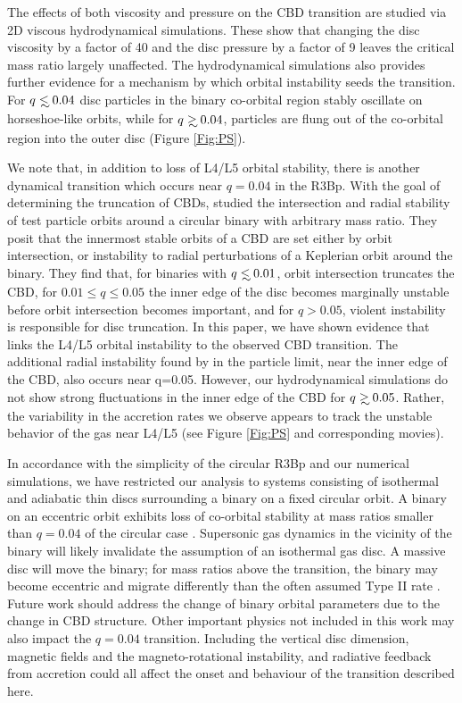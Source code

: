 \documentclass[usenatbib]{mnras}
\newcommand\lsim{\mathrel{\rlap{\lower4pt\hbox{\hskip1pt$\sim$}}
        \raise1pt\hbox{$<$}}}
\newcommand\gsim{\mathrel{\rlap{\lower4pt\hbox{\hskip1pt$\sim$}}
        \raise1pt\hbox{$>$}}}
\begin{document}
The effects of both viscosity and pressure on the CBD transition are
studied via 2D viscous hydrodynamical simulations. These show that
changing the disc viscosity by a factor of 40 and the disc pressure by
a factor of 9 leaves the critical mass ratio largely unaffected.  The
hydrodynamical simulations also provides further evidence for a
mechanism by which orbital instability seeds the transition. For
$q\lsim 0.04$ disc particles in the binary co-orbital region stably
oscillate on horseshoe-like orbits, while for $q \gsim 0.04$,
particles are flung out of the co-orbital region into the outer disc
(Figure \ref{Fig:PS}).


We note that, in addition to loss of L4/L5 orbital stability, there is
another dynamical transition which occurs near $q=0.04$ in the
R3Bp. With the goal of determining the truncation of CBDs,
\cite{RP:Excretion:1981} studied the intersection and radial stability
of test particle orbits around a circular binary with arbitrary mass
ratio. They posit that the innermost stable orbits of a CBD are set
either by orbit intersection, or instability to radial perturbations
of a Keplerian orbit around the binary. They find that, for binaries
with $q \lsim 0.01$, orbit intersection truncates the CBD, for $0.01
\leq q \leq 0.05$ the inner edge of the disc becomes marginally
unstable before orbit intersection becomes important, and for
$q>0.05$, violent instability is responsible for disc truncation. In
this paper, we have shown evidence that links the L4/L5 orbital
instability to the observed CBD transition. The additional radial
instability found by \cite{RP:Excretion:1981} in the particle limit,
near the inner edge of the CBD, also occurs near q=0.05. However, our
hydrodynamical simulations do not show strong fluctuations in the
inner edge of the CBD for $q \gsim 0.05$. Rather, the variability in
the accretion rates we observe appears to track the unstable behavior
of the gas near L4/L5 (see Figure \ref{Fig:PS} and corresponding
movies).


In accordance with the simplicity of the circular R3Bp and our
numerical simulations, we have restricted our analysis to systems
consisting of isothermal and adiabatic thin discs surrounding a binary
on a fixed circular orbit. A binary on an eccentric orbit exhibits
loss of co-orbital stability at mass ratios smaller than $q=0.04$ of
the circular case \citep{eR3BStability:2013}. Supersonic gas dynamics
in the vicinity of the binary will likely invalidate the assumption of
an isothermal gas disc. A massive disc will move the binary; for mass
ratios above the transition, the binary may become eccentric
\citep{Cuadra:2009, Roedig:2011:eccevo,Roedig:2012:Trqs} and migrate
differently than the often assumed Type II rate
\cite[\textit{e.g.}][]{HKM09,DottiMM:2015}. Future work should address
the change of binary orbital parameters due to the change in CBD
structure. Other important physics not included in this work may also
impact the $q=0.04$ transition. Including the vertical disc dimension,
magnetic fields and the magneto-rotational instability, and radiative
feedback from accretion could all affect the onset and behaviour of
the transition described here.
\end{document}
